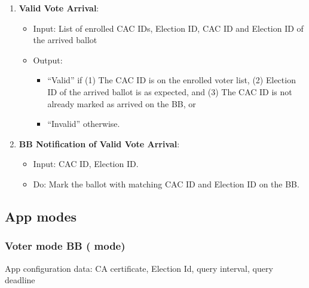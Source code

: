 \documentclass{article}
\begin{document}
\begin{enumerate}
    \item \textbf{Valid Vote Arrival}:
\begin{itemize}
    \item Input: List of enrolled CAC IDs, Election ID, CAC ID and Election ID of the arrived ballot
    \item Output: 
    \begin{itemize}
        \item ``Valid'' if     (1) The CAC ID is on the enrolled voter list, (2) Election ID of the arrived ballot is as expected, and (3) The CAC ID is not already marked as arrived on the BB, or
        \item ``Invalid'' otherwise.

    \end{itemize}
\end{itemize}
\label{Valid Vote Arrival}
    \item \textbf{BB Notification of Valid Vote Arrival}:
\begin{itemize}
    \item Input: CAC ID, Election ID.
    \item Do: Mark the ballot with matching CAC ID and Election ID on the BB.

\end{itemize}
\label{BB Notification of Valid Vote Arrival}
\end{enumerate}

    

\subsection{App modes}
\subsubsection{Voter mode BB (\BBInclusionCheck{} mode) }
App configuration data: CA certificate, Election Id, query interval, query deadline
\end{document}
